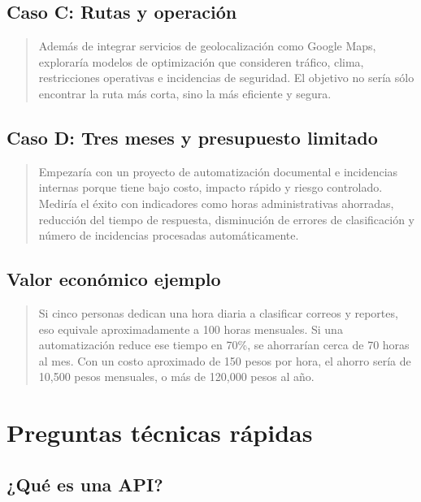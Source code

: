 \documentclass[12pt]{article}
\begin{document}
\subsection{Caso C: Rutas y operación}

\begin{quote}
Además de integrar servicios de geolocalización como Google Maps, exploraría modelos de optimización que consideren tráfico, clima, restricciones operativas e incidencias de seguridad. El objetivo no sería sólo encontrar la ruta más corta, sino la más eficiente y segura.
\end{quote}

\subsection{Caso D: Tres meses y presupuesto limitado}

\begin{quote}
Empezaría con un proyecto de automatización documental e incidencias internas porque tiene bajo costo, impacto rápido y riesgo controlado. Mediría el éxito con indicadores como horas administrativas ahorradas, reducción del tiempo de respuesta, disminución de errores de clasificación y número de incidencias procesadas automáticamente.
\end{quote}

\subsection{Valor económico ejemplo}

\begin{quote}
Si cinco personas dedican una hora diaria a clasificar correos y reportes, eso equivale aproximadamente a 100 horas mensuales. Si una automatización reduce ese tiempo en 70\%, se ahorrarían cerca de 70 horas al mes. Con un costo aproximado de 150 pesos por hora, el ahorro sería de 10,500 pesos mensuales, o más de 120,000 pesos al año.
\end{quote}

\section{Preguntas técnicas rápidas}

\subsection{¿Qué es una API?}
\end{document}
